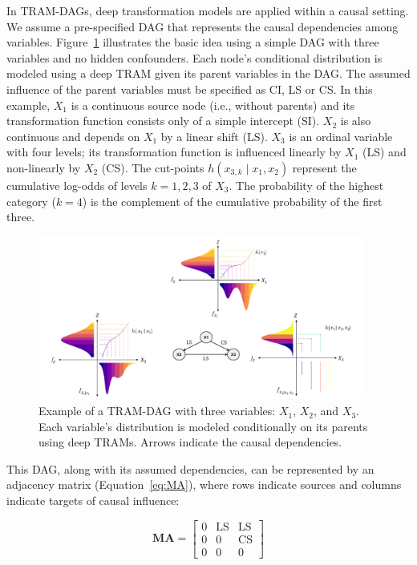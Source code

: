 In TRAM-DAGs, deep transformation models are applied within a causal setting. We assume a pre-specified DAG that represents the causal dependencies among variables. 
Figure~\ref{fig:tram_dag} illustrates the basic idea using a simple DAG with three variables and no hidden confounders. Each node's conditional distribution is modeled using a deep TRAM given its parent variables in the DAG. The assumed influence of the parent variables must be specified as CI, LS or CS. In this example, $X_1$ is a continuous source node (i.e., without parents) and its transformation function consists only of a simple intercept (SI). $X_2$ is also continuous and depends on $X_1$ by a linear shift (LS). $X_3$ is an ordinal variable with four levels; its transformation function is influenced linearly by $X_1$ (LS) and non-linearly by $X_2$ (CS). The cut-points $h(x_{3,k} \mid x_1, x_2)$ represent the cumulative log-odds of levels $k = 1, 2, 3$ of $X_3$. The probability of the highest category ($k = 4$) is the complement of the cumulative probability of the first three.


\begin{figure}[H]
\centering
\includegraphics[width=0.95\textwidth]{img/tram_dag.png}
\caption{Example of a TRAM-DAG with three variables: $X_1$, $X_2$, and $X_3$. Each variable's distribution is modeled conditionally on its parents using deep TRAMs. Arrows indicate the causal dependencies.}
\label{fig:tram_dag}
\end{figure}

This DAG, along with its assumed dependencies, can be represented by an adjacency matrix (Equation~\ref{eq:MA}), where rows indicate sources and columns indicate targets of causal influence:


\begin{equation}
\mathbf{MA} =
\begin{bmatrix}
  0 & \text{LS} & \text{LS} \\
  0 & 0  & \text{CS} \\
  0 & 0  & 0
\end{bmatrix}
\label{eq:MA}
\end{equation}

